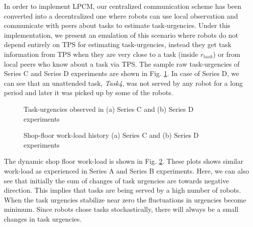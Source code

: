 \documentclass{intech}
\begin{document}
In order to implement LPCM, our centralized communication scheme has been converted into a decentralized one where robots can use local observation and communicate with peers about tasks to estimate task-urgencies. Under this implementation, we present an emulation of this scenario where robots do not depend entirely on TPS for estimating task-urgencies, instead they get task information from TPS when they are very close to a task (inside $r_{task}$) or from local peers who know about a task via TPS. %
%
The sample raw task-urgencies of Series C and Series D experiments are shown in Fig. \ref{fig:raw-urgencies-SC-SD}. In case of Series D, we can see that an unattended task, \textit{Task4}, was not served by any robot for a long period and later it was picked up by some of the robots. 
\begin{figure}
\centering
\hspace*{0.5cm}
\caption{\small Task-urgencies observed in (a) Series C and (b) Series D experiments}
\label{fig:raw-urgencies-SC-SD} 
\end{figure}
\begin{figure}
\centering
\hspace*{0.5cm}
\caption{\small Shop-floor work-load history (a) Series C and (b) Series D experiments}
\label{fig:workload-SC-SD} 
\end{figure}
The dynamic shop floor work-load is shown in Fig. \ref{fig:workload-SC-SD}. These plots shows similar work-load as experienced in Series A and Series B experiments. Here, we can also see that initially the sum of changes of task urgencies are towards negative direction. This implies that tasks are being served by a high number of robots. When the task urgencies stabilize near zero the fluctuations in urgencies become minimum. Since robots chose tasks stochastically, there will always be a small changes in task urgencies.
%
\end{document}
